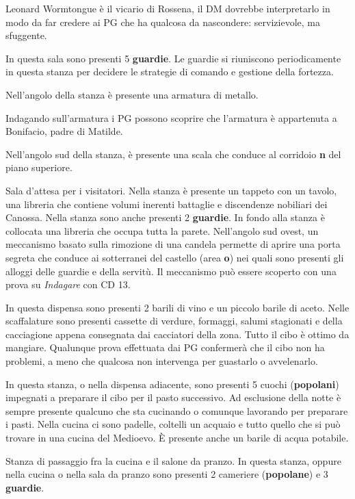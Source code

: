 \documentclass[letterpaper,twocolumn,openany,nodeprecatedcode]{dndbook}
\begin{document}
Leonard Wormtongue è il vicario di Rossena, il DM dovrebbe interpretarlo in modo da far credere ai PG che ha qualcosa da nascondere: servizievole, ma sfuggente.

In questa sala sono presenti 5 \textbf{guardie}. Le guardie si riuniscono periodicamente in questa stanza per decidere le strategie di comando e gestione della fortezza.

Nell'angolo della stanza è presente una armatura di metallo.

Indagando sull'armatura i PG possono scoprire che l'armatura è appartenuta a Bonifacio, padre di Matilde.

Nell'angolo sud della stanza, è presente una scala che conduce al corridoio \textbf{n} del piano superiore.

Sala d'attesa per i visitatori. Nella stanza è presente un tappeto con un tavolo, una libreria che contiene volumi inerenti battaglie e discendenze nobiliari dei Canossa.
Nella stanza sono anche presenti 2 \textbf{guardie}. In fondo alla stanza è collocata una libreria che occupa tutta la parete. Nell'angolo sud ovest, un meccanismo basato sulla rimozione di una candela permette di aprire una porta segreta che conduce ai sotterranei del castello (area \textbf{o}) nei quali sono presenti gli alloggi delle guardie e della servitù. Il meccanismo può essere scoperto con una prova su \textit{Indagare} con CD 13.

In questa dispensa sono presenti 2 barili di vino e un piccolo barile di aceto. Nelle scaffalature sono presenti cassette di verdure, formaggi, salumi stagionati e della cacciagione appena consegnata dai cacciatori della zona. Tutto il cibo è ottimo da mangiare. Qualunque prova effettuata dai PG confermerà che il cibo non ha problemi, a meno che qualcosa non intervenga per guastarlo o avvelenarlo.

In questa stanza, o nella dispensa adiacente, sono presenti 5 cuochi (\textbf{popolani}) impegnati a preparare il cibo per il pasto successivo. Ad esclusione della notte è sempre presente qualcuno che sta cucinando o comunque lavorando per preparare i pasti. Nella cucina ci sono padelle, coltelli un acquaio e tutto quello che si può trovare in una cucina del Medioevo. È presente anche un barile di acqua potabile.

Stanza di passaggio fra la cucina e il salone da pranzo. In questa stanza, oppure nella cucina o nella sala da pranzo sono presenti 2 cameriere (\textbf{popolane}) e 3 \textbf{guardie}.
\end{document}
